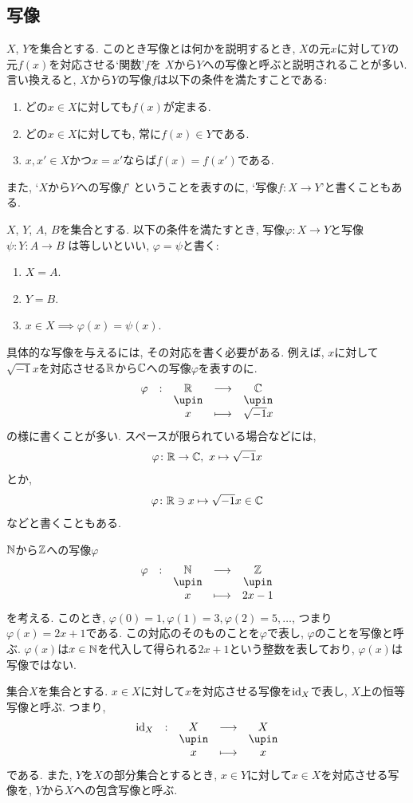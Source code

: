 \subsection{写像}
$X$, $Y$を集合とする.
このとき写像とは何かを説明するとき,
$X$の元$x$に対して$Y$の元$f(x)$を対応させる`関数'$f$を
$X$から$Y$への写像と呼ぶと説明されることが多い.
言い換えると, $X$から$Y$の写像$f$は以下の条件を満たすことである:
\begin{enumerate}
\item どの$x\in X$に対しても$f(x)$が定まる.
\item どの$x\in X$に対しても, 常に$f(x)\in Y$である.
\item $x, x'\in X$かつ$x=x'$ならば$f(x)=f(x')$である.
\end{enumerate}
また, `$X$から$Y$への写像$f$' ということを表すのに,
`写像$f\colon X\to Y$'と書くこともある.
\begin{definition}
$X$, $Y$, $A$, $B$を集合とする.
以下の条件を満たすとき,
写像$\varphi\colon X\to Y$と写像$\psi\colon Y\colon A\to  B$
は等しいといい, $\varphi=\psi$と書く:
\begin{enumerate}
\item $X=A$.
\item $Y=B$.
\item $x\in X\implies \varphi(x)=\psi(x)$.
\end{enumerate}
\end{definition}

具体的な写像を与えるには,
その対応を書く必要がある.
例えば, $x$に対して$\sqrt{-1}x$を対応させる$\mathbb{R}$から$\mathbb{C}$への写像$\varphi$を表すのに.
\begin{align*}
\shazo{\varphi}{\RR}{\CC}
{x}{\sqrt{-1}x}
\end{align*}
の様に書くことが多い.
スペースが限られている場合などには,
\begin{align*}
\varphi\colon \mathbb{R} \to \mathbb{C},\ x\mapsto \sqrt{-1}x
\end{align*}
とか,
\begin{align*}
\varphi\colon \mathbb{R}\ni x\mapsto \sqrt{-1}x \in \mathbb{C}
\end{align*}
などと書くこともある.

\begin{remark}
$\mathbb{N}$から$\mathbb{Z}$への写像$\varphi$
\begin{align*}
\shazo{\varphi}{\NN}{\ZZ}
{x}{2x-1}
\end{align*}
を考える.
このとき,
$\varphi(0)=1,\varphi(1)=3,\varphi(2)=5,\ldots$, 
つまり$\varphi(x)=2x+1$である.
この対応のそのものことを$\varphi$で表し, $\varphi$のことを写像と呼ぶ.
$\varphi(x)$は$x\in\mathbb{N}$を代入して得られる$2x+1$という整数を表しており,
$\varphi(x)$は写像ではない.
\end{remark}
\begin{definition}
集合$X$を集合とする.
$x\in X$に対して$x$を対応させる写像を$\operatorname{id}_X$で表し,
$X$上の恒等写像と呼ぶ. つまり,
\begin{align*}
\shazo{\id_X}{X}{X}
{x}{x}
\end{align*}
である.
また, $Y$を$X$の部分集合とするとき,
$x\in Y$に対して$x\in X$を対応させる写像を,
$Y$から$X$への包含写像と呼ぶ.
\end{definition}

